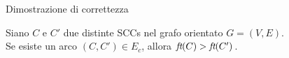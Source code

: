 \begin{frame}{Dimostrazione di correttezza}

\vspace{-9pt}
\begin{myboxtitle}[Teorema]
Siano $C$ e $C'$ due distinte SCCs nel grafo orientato $G=(V,E)$. \\ 
Se esiste un arco $(C,C') \in E_c$, allora $\textit{ft}(C) > \textit{ft}(C')$.
\end{myboxtitle}

\end{frame}

